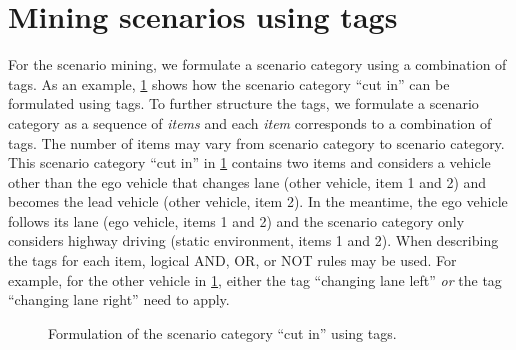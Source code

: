 \section{Mining scenarios using tags}
\label{sec:mining}

\cstartd
For the scenario mining, we formulate a scenario category using a combination of tags.
As an example, \cref{fig:cutin formulation tags} shows how the scenario category ``cut in'' can be formulated using tags.
To further structure the tags, we formulate a scenario category as a sequence of \emph{items} and each \emph{item} corresponds to a combination of tags.
The number of items may vary from scenario category to scenario category.
This scenario category ``cut in'' in \cref{fig:cutin formulation tags} contains two items and considers a vehicle other than the ego vehicle that changes lane (other vehicle, item 1 and 2) and becomes the lead vehicle (other vehicle, item 2).
In the meantime, the ego vehicle follows its lane (ego vehicle, items 1 and 2) and the scenario category only considers highway driving (static environment, items 1 and 2).
When describing the tags for each item, logical AND, OR, or NOT rules may be used. 
For example, for the other vehicle in \cref{fig:cutin formulation tags}, either the tag ``changing lane left'' \emph{or} the tag ``changing lane right'' need to apply.
\cendd

\begin{figure}
	\centering
	
	\caption{\cstartd Formulation of the scenario category ``cut in'' using tags.\cendd}
	\label{fig:cutin formulation tags}
\end{figure}


